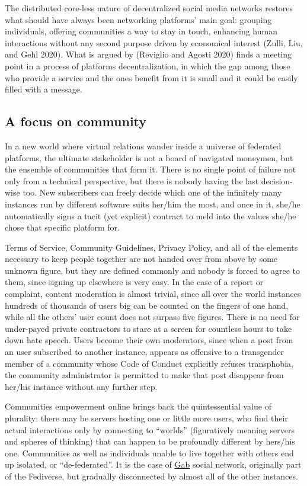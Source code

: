 \documentclass[
  a4paper,
]{book}
\begin{document}
The distributed core-less nature of decentralized social media networks restores what should have always been networking platforms' main goal: grouping individuals, offering communities a way to stay in touch, enhancing human interactions without any second purpose driven by economical interest {(Zulli, Liu, and Gehl 2020)}. What is argued by {(Reviglio and Agosti 2020)} finds a meeting point in a process of platforms decentralization, in which the gap among those who provide a service and the ones benefit from it is small and it could be easily filled with a message.

\hypertarget{a-focus-on-community}{%
\subsection{A focus on community}\label{a-focus-on-community}}

In a new world where virtual relations wander inside a universe of federated platforms, the ultimate stakeholder is not a board of navigated moneymen, but the ensemble of communities that form it. There is no single point of failure not only from a technical perspective, but there is nobody having the last decision-wise too. New subscribers can freely decide which one of the infinitely many instances run by different software suits her/him the most, and once in it, she/he automatically signs a tacit (yet explicit) contract to meld into the values she/he chose that specific platform for.

Terms of Service, Community Guidelines, Privacy Policy, and all of the elements necessary to keep people together are not handed over from above by some unknown figure, but they are defined commonly and nobody is forced to agree to them, since signing up elsewhere is very easy. In the case of a report or complaint, content moderation is almost trivial, since all over the world instances hundreds of thousands of users big can be counted on the fingers of one hand, while all the others' user count does not surpass five figures. There is no need for under-payed private contractors to stare at a screen for countless hours to take down hate speech. Users become their own moderators, since when a post from an user subscribed to another instance, appears as offensive to a transgender member of a community whose Code of Conduct explicitly refuses transphobia, the community administrator is permitted to make that post disappear from her/his instance without any further step.

Communities empowerment online brings back the quintessential value of plurality: there may be servers hosting one or little more users, who find their actual interactions only by connecting to ``worlds'' (figuratively meaning servers and spheres of thinking) that can happen to be profoundly different by hers/his one. Communities as well as individuals unable to live together with others end up isolated, or ``de-federated''. It is the case of \href{https://gab.com/}{Gab} social network, originally part of the Fediverse, but gradually disconnected by almost all of the other instances.
\end{document}
